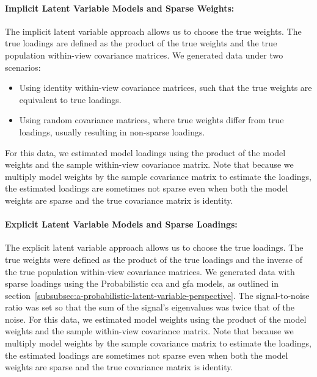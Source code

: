 \paragraph{Implicit Latent Variable Models and Sparse Weights:}
The implicit latent variable approach allows us to choose the true weights.
The true \gls{loadings} are defined as the product of the true weights and the true population within-view covariance matrices.
We generated data under two scenarios:
\begin{itemize}
    \item Using identity within-view covariance matrices, such that the true weights are equivalent to true loadings.
    \item Using random covariance matrices, where true weights differ from true loadings, usually resulting in non-sparse loadings.
\end{itemize}
For this data, we estimated model \gls{loadings} using the product of the model weights and the sample within-view covariance matrix.
Note that because we multiply model weights by the sample covariance matrix to estimate the loadings, the estimated \gls{loadings} are sometimes not sparse even when both the model weights are sparse and the true covariance matrix is identity.

\paragraph{Explicit Latent Variable Models and Sparse Loadings:}
The explicit latent variable approach allows us to choose the true \gls{loadings}.
The true weights were defined as the product of the true \gls{loadings} and the inverse of the true population within-view covariance matrices.
We generated data with sparse \gls{loadings} using the Probabilistic \acrshort{cca} and \acrshort{gfa} models, as outlined in section~\ref{subsubsec:a-probabilistic-latent-variable-perspective}.
The signal-to-noise ratio was set so that the sum of the signal's eigenvalues was twice that of the noise.
For this data, we estimated model \gls{weights} using the product of the model weights and the sample within-view covariance matrix.
Note that because we multiply model weights by the sample covariance matrix to estimate the loadings, the estimated \gls{loadings} are sometimes not sparse even when both the model weights are sparse and the true covariance matrix is identity.

